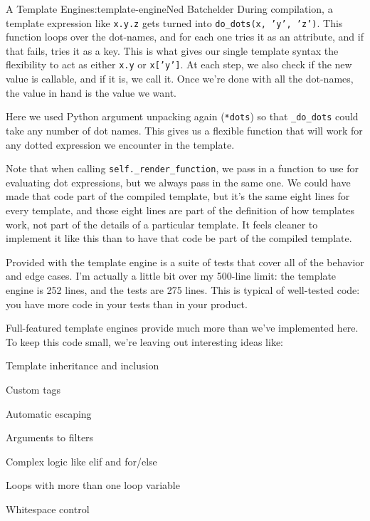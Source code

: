 \begin{aosachapter}{A Template Engine}{s:template-engine}{Ned Batchelder}
During compilation, a template expression like \texttt{x.y.z} gets
turned into \texttt{do\_dots(x, 'y', 'z')}. This function loops over the
dot-names, and for each one tries it as an attribute, and if that fails,
tries it as a key. This is what gives our single template syntax the
flexibility to act as either \texttt{x.y} or \texttt{x{[}'y'{]}}. At
each step, we also check if the new value is callable, and if it is, we
call it. Once we're done with all the dot-names, the value in hand is
the value we want.

Here we used Python argument unpacking again (\texttt{*dots}) so that
\texttt{\_do\_dots} could take any number of dot names. This gives us a
flexible function that will work for any dotted expression we encounter
in the template.

Note that when calling \texttt{self.\_render\_function}, we pass in a
function to use for evaluating dot expressions, but we always pass in
the same one. We could have made that code part of the compiled
template, but it's the same eight lines for every template, and those
eight lines are part of the definition of how templates work, not part
of the details of a particular template. It feels cleaner to implement
it like this than to have that code be part of the compiled template.

\label{testing}

Provided with the template engine is a suite of tests that cover all of
the behavior and edge cases. I'm actually a little bit over my 500-line
limit: the template engine is 252 lines, and the tests are 275 lines.
This is typical of well-tested code: you have more code in your tests
than in your product.

\label{whats-left-out}

Full-featured template engines provide much more than we've implemented
here. To keep this code small, we're leaving out interesting ideas like:

\begin{aosaitemize}

\item
  Template inheritance and inclusion
\item
  Custom tags
\item
  Automatic escaping
\item
  Arguments to filters
\item
  Complex logic like elif and for/else
\item
  Loops with more than one loop variable
\item
  Whitespace control
\end{aosaitemize}


\end{aosachapter}
